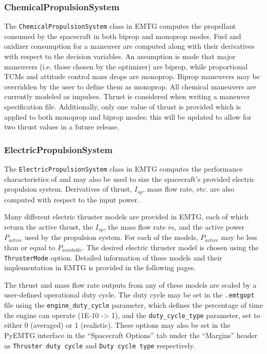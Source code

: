 \subsubsection{ChemicalPropulsionSystem}
\label{sec:chemical_propulsion_system}
The {\tt ChemicalPropulsionSystem} class in \ac{EMTG} computes the propellant consumed by the spacecraft in both biprop and monoprop modes. Fuel and oxidizer consumption for a maneuver are computed along with their derivatives with respect to the decision variables. An assumption is made that major maneuvers (i.e. those chosen by the optimizer) are biprop, while proportional TCMs and attitude control mass drops are monoprop. Biprop maneuvers may be overridden by the user to define them as monoprop. All chemical maneuvers are currently modeled as impulses. Thrust is considered when writing a maneuver specification file. Additionally, only one value of thrust is provided which is applied to both monoprop and biprop modes; this will be updated to allow for two thrust values in a future release.

\subsubsection{ElectricPropulsionSystem}
\label{sec:electric_propulsion_system}
The {\tt ElectricPropulsionSystem} class in \ac{EMTG} computes the performance characteristics of and may also be used to size the spacecraft's provided electric propulsion system. Derivatives of thrust, $I_{sp}$, mass flow rate, etc. are also computed with respect to the input power.

Many different electric thruster models are provided in \ac{EMTG}, each of which return the active thrust, the $I_{sp}$, the mass flow rate $\dot{m}$, and the active power $P_{active}$ used by the propulsion system. For each of the models, $P_{active}$ may be less than or equal to $P_{available}$. The desired electric thruster model is chosen using the {\tt ThrusterMode} option. 
Detailed information of these models and their implementation in \ac{EMTG} is provided in the following pages.


The thrust and mass flow rate outputs from any of these models are scaled by a user-defined operational duty cycle. The duty cycle may be set in the {\tt .emtgopt} file using the {\tt engine\_duty\_cycle} parameter, which defines the percentage of time the engine can operate (1E-10 -> 1), and the {\tt duty\_cycle\_type} parameter, set to either 0 (averaged) or 1 (realistic). These options may also be set in the PyEMTG interface in the ``Spacecraft Options'' tab under the ``Margins'' header as {\tt Thruster duty cycle} and {\tt Duty cycle type} respectively.


